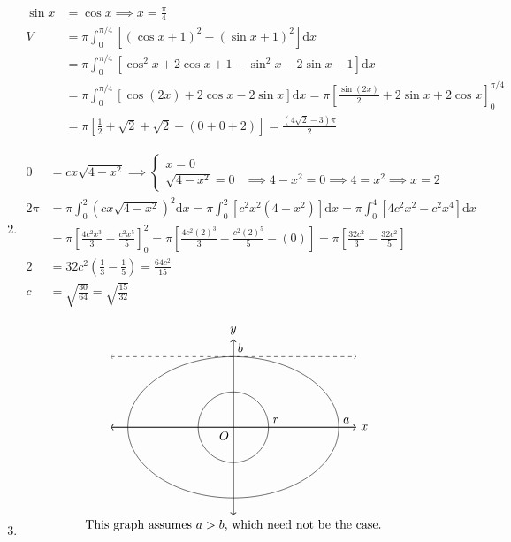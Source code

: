 \documentclass[12pt, A4]{report}
\renewcommand{\d}{\text{d}}
\begin{document}
\begin{enumerate}
					\begin{align*}
						\sin x &= \cos x 
								\implies x = \frac{\pi}{4} \\
						V &= \pi\int_0^{\pi/4}\left[(\cos x + 1)^2 - (\sin x + 1)^2\right]\d x \\
							&= \pi\int_0^{\pi/4}\left[\cos^2x + 2\cos x + 1 - \sin^2 x - 2\sin x - 1\right]\d x \\
							&= \pi\int_0^{\pi/4}\left[\cos(2x) + 2\cos x - 2\sin x\right]\d x
								= \pi\left[\frac{\sin(2x)}{2} + 2\sin x + 2\cos x\right]_0^{\pi/4} \\
							&= \pi\left[\frac{1}{2} + \sqrt{2} + \sqrt{2} - (0 + 0 + 2)\right]
								= \frac{(4\sqrt{2} - 3)\pi}{2}
					\end{align*}
				\item
					\begin{align*}
						0 &= cx\sqrt{4 - x^2} \implies 
							\begin{cases}
	 							x = 0 \\
	 							\sqrt{4 - x^2} = 0 &\implies 4 - x^2 = 0 
	 								\implies 4 = x^2 
	 								\implies x = 2
							\end{cases} \\
						2\pi &= \pi\int_0^2\left(cx\sqrt{4 - x^2}\right)^2\d x
									= \pi\int_0^2\left[c^2x^2(4 - x^2)\right]\d x
									= \pi\int_0^4\left[4c^2x^2 - c^2x^4\right]\d x \\
								&= \pi\left[\frac{4c^2x^3}{3} - \frac{c^2x^5}{5}\right]_0^2
									= \pi\left[\frac{4c^2(2)^3}{3} - \frac{c^2(2)^5}{5} - (0)\right]
									= \pi\left[\frac{32c^2}{3} - \frac{32c^2}{5}\right] \\
							2 &= 32c^2\left(\frac{1}{3} - \frac{1}{5}\right) 
									= \frac{64c^2}{15} \\
							c &= \sqrt{\frac{30}{64}} = \sqrt{\frac{15}{32}}
					\end{align*}
				\newpage\item
					\[\begin{tikzpicture}
						\draw[thick, <->] (-3.5, 0) -- (3.5, 0) node[anchor = west]{$x$};
						\draw[thick, <->] (0, -2.5) -- (0, 2.5) node[anchor = south]{$y$};
							\node[anchor = north east]{$O$};
						\draw[] circle[radius = 1];
							\node[anchor = south west] at (1, 0) {$r$};
						\draw[] ellipse(3cm and 2cm);
							\node[anchor = south west] at (0, 2) {$b$};
							\node[anchor = south west] at (3, 0) {$a$};
						\draw[dashed, <->] (-3.5, 2) -- (3.5, 2);
						\node[anchor = north] at (0, -2.5) {This graph assumes $a > b$, which need not be the case.};

\end{tikzpicture}\]
\end{enumerate}
\end{document}

